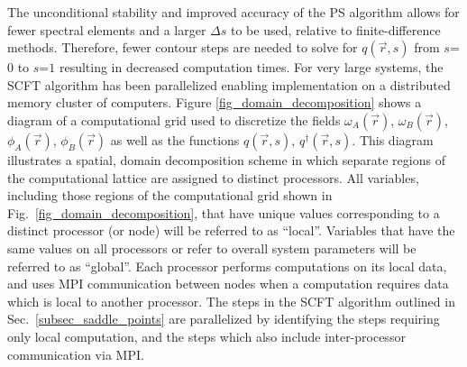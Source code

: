 \documentclass[onecolumn,amsmath,amssymb,floatfix]{elsart}
\begin{document}
The unconditional stability and improved accuracy
of the PS algorithm allows for fewer spectral elements and
a larger $\Delta s$ to be used, relative to finite-difference methods.
Therefore, fewer contour steps are needed to solve for
$q({\vec r},s)$ from $s$=$0$ to $s$=$1$ resulting in decreased
computation times.
For very large systems, the SCFT algorithm has been parallelized enabling
implementation on a distributed memory cluster of computers.
Figure \ref{fig_domain_decomposition} shows a diagram of a
computational grid used to discretize the fields $\omega_A({\vec r})$,
$\omega_B({\vec r})$, $\phi_A({\vec r})$, $\phi_B({\vec r})$
as well as the functions $q({\vec r},s)$, $q^{\dagger}({\vec r},s)$.
This diagram illustrates a spatial, domain decomposition
scheme in which separate regions of the computational lattice are
assigned to distinct processors.
All variables, including those regions of the computational grid shown in
Fig.~\ref{fig_domain_decomposition}, that have unique values
corresponding to a distinct processor (or node) will be referred
to as ``local''.
Variables that have the same values on all processors or refer to
overall system parameters will be referred to as ``global''.
Each processor performs computations on its local data, and uses MPI
communication between nodes when a
computation requires data which is local to another processor.
The steps in the SCFT algorithm outlined in
Sec.~\ref{subsec_saddle_points} are parallelized by identifying
the steps requiring only local computation, and the steps which
also include inter-processor communication via MPI.
\end{document}
